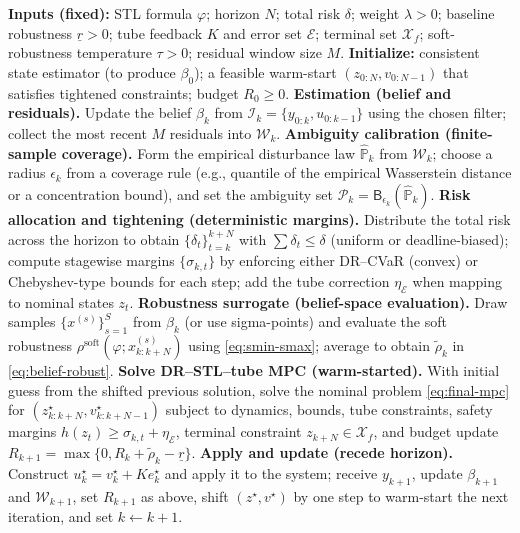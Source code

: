 \documentclass[journal]{IEEEtran}
\theoremstyle{definition}
\begin{document}
\begin{algorithm}[t]
\caption{Safe-Regret MPC (belief-space DR--STL with tube/track and calibrated tightening)}
\label{alg:safe-regret-mpc}
\begin{algorithmic}[1]
\State \textbf{Inputs (fixed):} STL formula $\varphi$; horizon $N$; total risk $\delta$;
weight $\lambda>0$; baseline robustness $\underline{r}>0$; tube feedback $K$ and error set $\mathcal{E}$;
terminal set $\mathcal{X}_f$; soft-robustness temperature $\tau>0$; residual window size $M$.
\State \textbf{Initialize:} consistent state estimator (to produce $\beta_0$); a feasible warm-start
$(z_{0:N},v_{0:N-1})$ that satisfies tightened constraints; budget $R_0\ge 0$.
  \State \textbf{Estimation (belief and residuals).}
  Update the belief $\beta_k$ from $\mathcal{I}_k=\{y_{0:k},u_{0:k-1}\}$ using the chosen filter;
  collect the most recent $M$ residuals into $\mathcal{W}_k$.
  \State \textbf{Ambiguity calibration (finite-sample coverage).}
  Form the empirical disturbance law $\widehat{\mathbb{P}}_k$ from $\mathcal{W}_k$; choose a radius
  $\epsilon_k$ from a coverage rule (e.g., quantile of the empirical Wasserstein distance or a
  concentration bound), and set the ambiguity set $\mathcal{P}_k=\mathsf{B}_{\epsilon_k}(\widehat{\mathbb{P}}_k)$.
  \State \textbf{Risk allocation and tightening (deterministic margins).}
  Distribute the total risk across the horizon to obtain $\{\delta_t\}_{t=k}^{k+N}$ with
  $\sum \delta_t\le \delta$ (uniform or deadline-biased); compute stagewise margins $\{\sigma_{k,t}\}$
  by enforcing either DR--CVaR (convex) or Chebyshev-type bounds for each step; add the tube
  correction $\eta_{\mathcal{E}}$ when mapping to nominal states $z_t$.
  \State \textbf{Robustness surrogate (belief-space evaluation).}
  Draw samples $\{x^{(s)}\}_{s=1}^{S}$ from $\beta_k$ (or use sigma-points) and evaluate the
  soft robustness $\rho^{\text{soft}}(\varphi;x^{(s)}_{k:k+N})$ using
  \eqref{eq:smin-smax}; average to obtain $\widetilde{\rho}_k$ in \eqref{eq:belief-robust}.
  \State \textbf{Solve DR--STL--tube MPC (warm-started).}
  With initial guess from the shifted previous solution, solve the nominal problem
  \eqref{eq:final-mpc} for $(z_{k:k+N}^\star,v_{k:k+N-1}^\star)$ subject to dynamics, bounds,
  tube constraints, safety margins $h(z_t)\ge \sigma_{k,t}+\eta_{\mathcal{E}}$, terminal
  constraint $z_{k+N}\in\mathcal{X}_f$, and budget update
  $R_{k+1}=\max\{0,R_k+\widetilde{\rho}_k-\underline{r}\}$.
  \State \textbf{Apply and update (recede horizon).}
  Construct $u_k^\star=v_k^\star+K e_k^\star$ and apply it to the system; receive $y_{k+1}$,
  update $\beta_{k+1}$ and $\mathcal{W}_{k+1}$, set $R_{k+1}$ as above, shift
  $(z^\star,v^\star)$ by one step to warm-start the next iteration, and set $k\leftarrow k{+}1$.
\EndFor
\end{algorithmic}
\end{algorithm}
\end{document}
